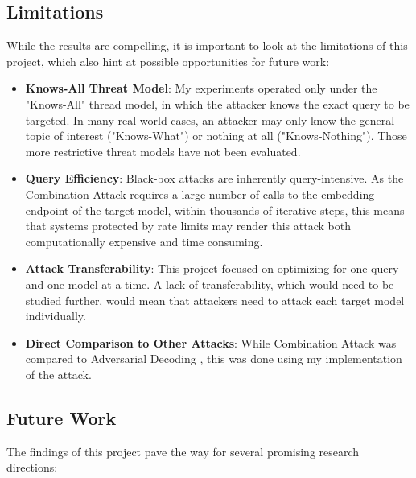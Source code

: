 \documentclass[a4paper, sigconf]{acmart}
\begin{document}
\subsection{Limitations}

While the results are compelling, it is important to look at the limitations of this project, which also hint at possible opportunities for future work:

\begin{itemize}
  \item \textbf{Knows-All Threat Model}: My experiments operated only under the "Knows-All" thread model, in which the attacker knows the exact query to be targeted. In many real-world cases, an attacker may only know the general topic of interest ("Knows-What") or nothing at all ("Knows-Nothing"). Those more restrictive threat models have not been evaluated.
  \item \textbf{Query Efficiency}: Black-box attacks are inherently query-intensive. As the Combination Attack requires a large number of calls to the embedding endpoint of the target model, within thousands of iterative steps, this means that systems protected by rate limits may render this attack both computationally expensive and time consuming. 
  \item \textbf{Attack Transferability}: This project focused on optimizing for one query and one model at a time. A lack of transferability, which would need to be studied further, would mean that attackers need to attack each target model individually. 
  \item \textbf{Direct Comparison to Other Attacks}: While Combination Attack was compared to Adversarial Decoding \cite{zhang2025-adv}, this was done using my implementation of the attack. 
\end{itemize}


\subsection{Future Work}

The findings of this project pave the way for several promising research directions:
\end{document}
